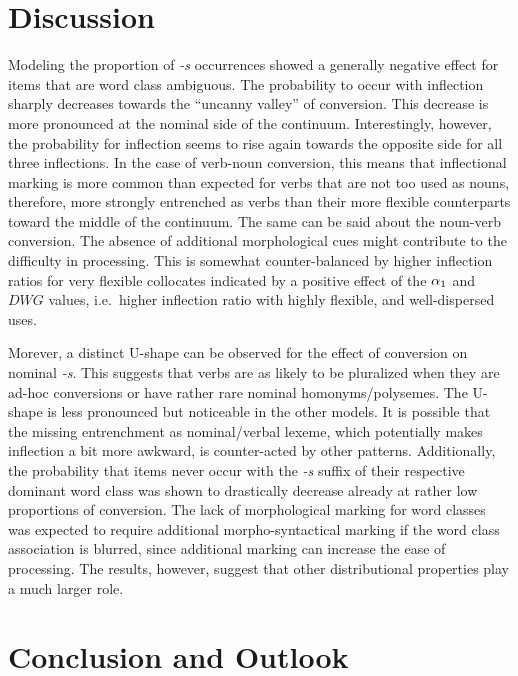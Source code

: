 \documentclass[
]{article}
\begin{document}
\hypertarget{disc}{%
\section{Discussion}\label{disc}}

Modeling the proportion of \emph{-s} occurrences showed a generally
negative effect for items that are word class ambiguous. The probability
to occur with inflection sharply decreases towards the ``uncanny
valley'' of conversion. This decrease is more pronounced at the nominal
side of the continuum. Interestingly, however, the probability for
inflection seems to rise again towards the opposite side for all three
inflections. In the case of verb-noun conversion, this means that
inflectional marking is more common than expected for verbs that are not
too used as nouns, therefore, more strongly entrenched as verbs than
their more flexible counterparts toward the middle of the continuum. The
same can be said about the noun-verb conversion. The absence of
additional morphological cues might contribute to the difficulty in
processing. This is somewhat counter-balanced by higher inflection
ratios for very flexible collocates indicated by a positive effect of
the \(\alpha\textsubscript{1}\) and \(DWG\) values, i.e.~higher
inflection ratio with highly flexible, and well-dispersed uses.

Morever, a distinct U-shape can be observed for the effect of conversion
on nominal \emph{-s}. This suggests that verbs are as likely to be
pluralized when they are ad-hoc conversions or have rather rare nominal
homonyms/polysemes. The U-shape is less pronounced but noticeable in the
other models. It is possible that the missing entrenchment as
nominal/verbal lexeme, which potentially makes inflection a bit more
awkward, is counter-acted by other patterns. Additionally, the
probability that items never occur with the \emph{-s} suffix of their
respective dominant word class was shown to drastically decrease already
at rather low proportions of conversion. The lack of morphological
marking for word classes was expected to require additional
morpho-syntactical marking if the word class association is blurred,
since additional marking can increase the ease of processing. The
results, however, suggest that other distributional properties play a
much larger role.

\hypertarget{conc}{%
\section{Conclusion and Outlook}\label{conc}}
\end{document}
